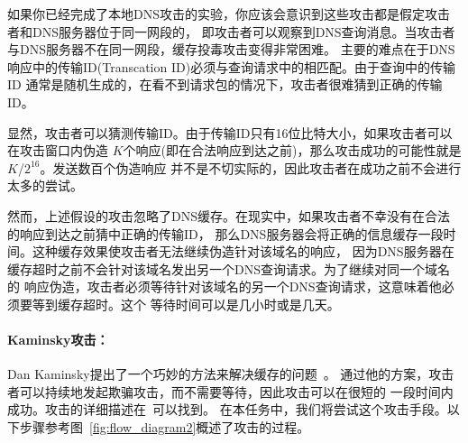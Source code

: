 如果你已经完成了本地DNS攻击的实验，你应该会意识到这些攻击都是假定攻击者和DNS服务器位于同一网段的，
即攻击者可以观察到DNS查询消息。当攻击者与DNS服务器不在同一网段，缓存投毒攻击变得非常困难。
主要的难点在于DNS响应中的传输ID(Transcation ID)必须与查询请求中的相匹配。由于查询中的传输ID
通常是随机生成的，在看不到请求包的情况下，攻击者很难猜到正确的传输ID。


显然，攻击者可以猜测传输ID。由于传输ID只有16位比特大小，如果攻击者可以在攻击窗口内伪造
$K$个响应(即在合法响应到达之前)，那么攻击成功的可能性就是$K$/$2^{16}$。发送数百个伪造响应
并不是不切实际的，因此攻击者在成功之前不会进行太多的尝试。


然而，上述假设的攻击忽略了DNS缓存。在现实中，如果攻击者不幸没有在合法的响应到达之前猜中正确的传输ID，
那么DNS服务器会将正确的信息缓存一段时间。这种缓存效果使攻击者无法继续伪造针对该域名的响应，
因为DNS服务器在缓存超时之前不会针对该域名发出另一个DNS查询请求。为了继续对同一个域名的
响应伪造，攻击者必须等待针对该域名的另一个DNS查询请求，这意味着他必须要等到缓存超时。这个
等待时间可以是几小时或是几天。


\paragraph{Kaminsky攻击：} 
Dan Kaminsky提出了一个巧妙的方法来解决缓存的问题~\cite{dns:Kaminsky}。
通过他的方案，攻击者可以持续地发起欺骗攻击，而不需要等待，因此攻击可以在很短的
一段时间内成功。攻击的详细描述在~\cite{dns:Kaminsky,seedbook}可以找到。
在本任务中，我们将尝试这个攻击手段。以下步骤参考图~\ref{fig:flow_diagram2}概述了攻击的过程。


